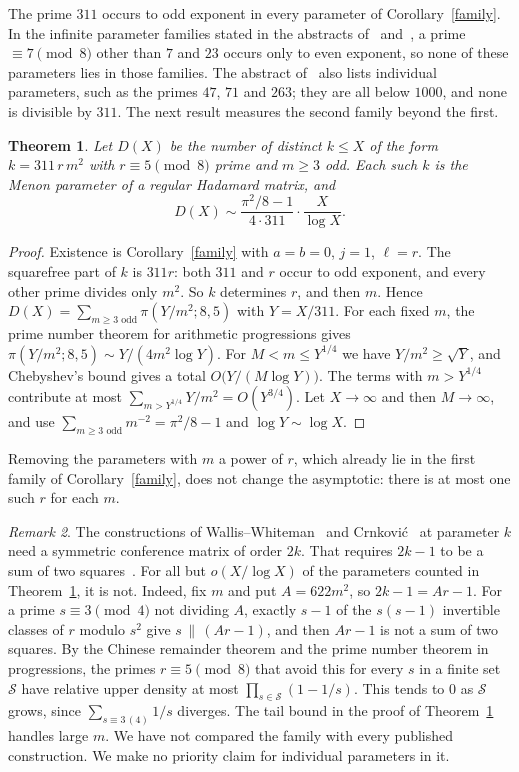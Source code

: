 \documentclass[11pt]{article}
\newtheorem{theorem}{Theorem}
\theoremstyle{remark}
\newtheorem{remark}[theorem]{Remark}
\begin{document}
The prime $311$ occurs to odd exponent in every parameter of Corollary~\ref{family}. In the infinite parameter families stated in the abstracts of~\cite{XXS} and~\cite{XXS07}, a prime $\equiv7\pmod8$ other than $7$ and $23$ occurs only to even exponent, so none of these parameters lies in those families. The abstract of~\cite{XXS07} also lists individual parameters, such as the primes $47$, $71$ and $263$; they are all below $1000$, and none is divisible by $311$. The next result measures the second family beyond the first.

\begin{theorem}\label{count}
Let $D(X)$ be the number of distinct $k\le X$ of the form $k=311\,r\,m^2$ with $r\equiv5\pmod8$ prime and $m\ge3$ odd. Each such $k$ is the Menon parameter of a regular Hadamard matrix, and
\[
 D(X)\sim\frac{\pi^2/8-1}{4\cdot311}\cdot\frac{X}{\log X}.
\]
\end{theorem}
\begin{proof}
Existence is Corollary~\ref{family} with $a=b=0$, $j=1$, $\ell=r$. The squarefree part of $k$ is $311r$: both $311$ and $r$ occur to odd exponent, and every other prime divides only $m^2$. So $k$ determines $r$, and then $m$. Hence $D(X)=\sum_{m\ge3\text{ odd}}\pi(Y/m^2;8,5)$ with $Y=X/311$. For each fixed $m$, the prime number theorem for arithmetic progressions gives $\pi(Y/m^2;8,5)\sim Y/(4m^2\log Y)$. For $M<m\le Y^{1/4}$ we have $Y/m^2\ge\sqrt Y$, and Chebyshev's bound gives a total $O\big(Y/(M\log Y)\big)$. The terms with $m>Y^{1/4}$ contribute at most $\sum_{m>Y^{1/4}}Y/m^2=O(Y^{3/4})$. Let $X\to\infty$ and then $M\to\infty$, and use $\sum_{m\ge3\text{ odd}}m^{-2}=\pi^2/8-1$ and $\log Y\sim\log X$.
\end{proof}

Removing the parameters with $m$ a power of $r$, which already lie in the first family of Corollary~\ref{family}, does not change the asymptotic: there is at most one such $r$ for each $m$.

\begin{remark}\label{conference}
The constructions of Wallis--Whiteman~\cite[Corollary~17]{WW} and Crnkovi\'c~\cite[Theorem~2]{Crn} at parameter $k$ need a symmetric conference matrix of order $2k$. That requires $2k-1$ to be a sum of two squares~\cite{vLS}. For all but $o(X/\log X)$ of the parameters counted in Theorem~\ref{count}, it is not. Indeed, fix $m$ and put $A=622m^2$, so $2k-1=Ar-1$. For a prime $s\equiv3\pmod4$ not dividing $A$, exactly $s-1$ of the $s(s-1)$ invertible classes of $r$ modulo $s^2$ give $s\,\|\,(Ar-1)$, and then $Ar-1$ is not a sum of two squares. By the Chinese remainder theorem and the prime number theorem in progressions, the primes $r\equiv5\pmod8$ that avoid this for every $s$ in a finite set $\mathcal S$ have relative upper density at most $\prod_{s\in\mathcal S}(1-1/s)$. This tends to $0$ as $\mathcal S$ grows, since $\sum_{s\equiv3\,(4)}1/s$ diverges. The tail bound in the proof of Theorem~\ref{count} handles large $m$. We have not compared the family with every published construction. We make no priority claim for individual parameters in it.
\end{remark}
\end{document}
